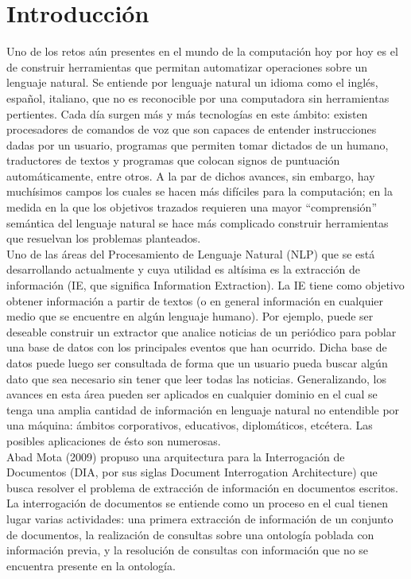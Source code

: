 \chapter*{Introducción} \label{chap:intro}

Uno de los retos aún presentes en el mundo de la computación hoy por hoy es el de construir herramientas que permitan automatizar operaciones sobre un lenguaje natural. Se entiende por lenguaje natural un idioma como el inglés, español, italiano, que no es reconocible por una computadora sin herramientas pertientes. Cada día surgen más y más tecnologías en este ámbito: existen procesadores de comandos de voz que son capaces de entender instrucciones dadas por un usuario, programas que permiten tomar dictados de un humano, traductores de textos y programas que colocan signos de puntuación automáticamente, entre otros. A la par de dichos avances, sin embargo, hay muchísimos campos los cuales se hacen más difíciles para la computación; en la medida en la que los objetivos trazados requieren una mayor ``comprensión'' semántica del lenguaje natural se hace más complicado construir herramientas que resuelvan los problemas planteados. \\ 

Uno de las áreas del Procesamiento de Lenguaje Natural (NLP) que se está desarrollando actualmente y cuya utilidad es altísima es la extracción de información (IE, que significa Information Extraction). La IE tiene como objetivo obtener información a partir de textos (o en general información en cualquier medio que se encuentre en algún lenguaje humano). Por ejemplo, puede ser deseable construir un extractor que analice noticias de un periódico para poblar una base de datos con los principales eventos que han ocurrido. Dicha base de datos puede luego ser consultada de forma que un usuario pueda buscar algún dato que sea necesario sin tener que leer todas las noticias. Generalizando, los avances en esta  área pueden ser aplicados en cualquier dominio en el cual se tenga una amplia cantidad de información en lenguaje natural no entendible por una máquina: ámbitos corporativos, educativos, diplomáticos, etcétera. Las posibles aplicaciones de ésto son numerosas.\\

Abad Mota (2009) \cite{documentInterrogationArchitecture} propuso una arquitectura para la Interrogación de Documentos (DIA, por sus siglas Document Interrogation Architecture) que busca resolver el problema de extracción de información en documentos escritos. La interrogación de documentos se entiende como un proceso en el cual tienen lugar varias actividades: una primera extracción de información de un conjunto de documentos, la realización de consultas sobre una ontología poblada con información previa, y la resolución de consultas con información que no se encuentra presente en la ontología. \\

